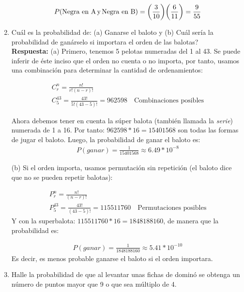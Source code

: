 \documentclass[12pt]{article}
\newcommand{\up}[1]{^{#1}}
\begin{document}
\begin{enumerate}
       \begin{gather}
        P(\text{Negra en A}\, \text{y} \, \text{Negra en B}) = \qty(\frac{3}{10})\qty(\frac{6}{11}) = \frac{9}{55} 
    \end{gather}
    
    
    \item Cuál es la probabilidad de: (a) Ganarse el baloto y (b) Cuál sería la probabilidad de ganárselo si importara el orden de las balotas?\\
    
    \textbf{Respuesta:} (a) Primero, tenemos 5 pelotas numeradas del 1 al 43. Se puede inferir de éste inciso que el orden no cuenta o no importa, por tanto, usamos una combinación para determinar la cantidad de ordenamientos:
    
    \begin{gather}
        C_r\up{n}= \frac{n!}{r!(n-r)!}\\
        C_{5}\up{43} = \frac{43!}{5!(43-5)!} = 962598 \quad \text{Combinaciones posibles}
    \end{gather}
    
    Ahora debemos tener en cuenta la súper balota (también llamada la \textit{serie}) numerada de 1 a 16. Por tanto: $962598*16=15401568$ son todas las formas de jugar el baloto. Luego, la probabilidad de ganar el baloto es:
    \begin{gather}
        P(ganar) = \frac{1}{15401568} \approx 6.49*10\up{-8}
    \end{gather}
    
    (b) Si el orden importa, usamos permutación sin repetición (el baloto dice que no se pueden repetir balotas):
    
     \begin{gather}
        P_r\up{n}= \frac{n!}{(n-r)!}\\
        P_{5}\up{43} = \frac{43!}{(43-5)!} = 115511760 \quad \text{Permutaciones posibles}
    \end{gather}
    Y con la superbalota: $115511760*16=1848188160$, de manera que la probabilidad es:
    
      \begin{gather}
        P(ganar) = \frac{1}{1848188160} \approx 5.41*10\up{-10}
    \end{gather}
    Es decir, es menos probable ganarse el baloto si el orden importara.
    
    \item Halle la probabilidad de que al levantar unas fichas de dominó se obtenga un número de puntos mayor que 9 o que sea múltiplo de 4.\\
    

\end{enumerate}
\end{document}
